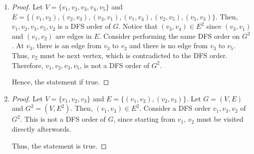 \documentclass[10pt]{article}
\begin{document}
\begin{enumerate}
	\item
	\begin{comment}
		Prove that, for some graph $G$, there is a depth first search order of
		$G$ that is not a depth first search order of $G^2$
	\end{comment}
	\begin{proof}
		Let $V = \{v_1, v_2, v_3, v_4, v_5\}$ and $E = \{(v_1, v_2), (v_2,
		v_3), (v_3, v_1), (v_1, v_4), (v_2, v_5), (v_5, v_3)\}$.
		Then, $v_1, v_2, v_3, v_5, v_2$ is a DFS order of $G$.
		Notice that $(v_3, v_4) \in E^2$ since $(v_3, v_1)$ and $(v_1, v_2)$
		are edges in $E$.
		Consider performing the same DFS order on $G^2$.
		At $v_3$, there is an edge from $v_3$ to $v_2$ and there is no edge
		from $v_3$ to $v_5$.
		Thus, $v_2$ must be next vertex, which is contradicted to the DFS
		order.
		Therefore, $v_1, v_2, v_3, v_5$, is not a DFS order of $G^2$.

		Hence, the statement if true.
	\end{proof}

	\item
	\begin{comment}
		Prove that, for some graph $G$, there is a depth frist search order of
		$G^2$ that is not a depth first search order of $G$
	\end{comment}
	\begin{proof}
		Let $V = \{v_1, v_2, v_3\}$ and $E = \{(v_1, v_2), (v_2, v_3)\}$.
		Let $G=(V,E)$ and $G^2 = (V, E^2)$.
		Then, $(v_1, v_3) \in E^2$.
		Consider a DFS order $v_1, v_3, v_2$ of $G^2$.
		This is not a DFS order of $G$, since starting from $v_1$, $v_2$ must
		be visited directly afterwords.

		Thus, the statement is true.
	\end{proof}

\end{enumerate}
\end{document}
